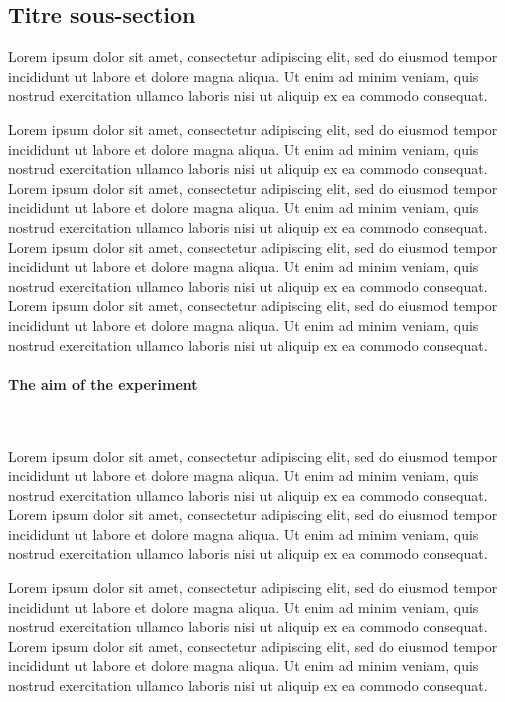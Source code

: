 \documentclass[a4paper]{book}
\begin{document}
\subsection{Titre sous-section}

Lorem ipsum dolor sit amet, consectetur adipiscing elit, sed do eiusmod tempor
incididunt ut labore et dolore magna aliqua. Ut enim ad minim veniam, quis
nostrud exercitation ullamco laboris nisi ut aliquip ex ea commodo consequat.

Lorem ipsum dolor sit amet, consectetur adipiscing elit, sed do eiusmod tempor
incididunt ut labore et dolore magna aliqua. Ut enim ad minim veniam, quis
nostrud exercitation ullamco laboris nisi ut aliquip ex ea commodo consequat.
Lorem ipsum dolor sit amet, consectetur adipiscing elit, sed do eiusmod tempor
incididunt ut labore et dolore magna aliqua. Ut enim ad minim veniam, quis
nostrud exercitation ullamco laboris nisi ut aliquip ex ea commodo consequat.
Lorem ipsum dolor sit amet, consectetur adipiscing elit, sed do eiusmod tempor
incididunt ut labore et dolore magna aliqua. Ut enim ad minim veniam, quis
nostrud exercitation ullamco laboris nisi ut aliquip ex ea commodo consequat.
Lorem ipsum dolor sit amet, consectetur adipiscing elit, sed do eiusmod tempor
incididunt ut labore et dolore magna aliqua. Ut enim ad minim veniam, quis
nostrud exercitation ullamco laboris nisi ut aliquip ex ea commodo consequat.


\paragraph{The aim of the experiment}\vspace{-10pt}\mbox{} \

Lorem ipsum dolor sit amet, consectetur adipiscing elit, sed do eiusmod tempor
incididunt ut labore et dolore magna aliqua. Ut enim ad minim veniam, quis
nostrud exercitation ullamco laboris nisi ut aliquip ex ea commodo consequat.
Lorem ipsum dolor sit amet, consectetur adipiscing elit, sed do eiusmod tempor
incididunt ut labore et dolore magna aliqua. Ut enim ad minim veniam, quis
nostrud exercitation ullamco laboris nisi ut aliquip ex ea commodo consequat.

Lorem ipsum dolor sit amet, consectetur adipiscing elit, sed do eiusmod tempor
incididunt ut labore et dolore magna aliqua. Ut enim ad minim veniam, quis
nostrud exercitation ullamco laboris nisi ut aliquip ex ea commodo consequat.
Lorem ipsum dolor sit amet, consectetur adipiscing elit, sed do eiusmod tempor
incididunt ut labore et dolore magna aliqua. Ut enim ad minim veniam, quis
nostrud exercitation ullamco laboris nisi ut aliquip ex ea commodo consequat.
\end{document}
